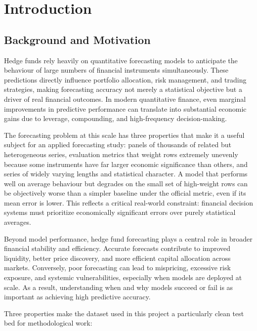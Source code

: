 \section{Introduction}
\label{sec:problem}

\subsection{Background and Motivation}
\label{sec:intro:background}

Hedge funds rely heavily on quantitative forecasting models to anticipate the behaviour of large numbers of financial instruments simultaneously. These predictions directly influence portfolio allocation, risk management, and trading strategies, making forecasting accuracy not merely a statistical objective but a driver of real financial outcomes. In modern quantitative finance, even marginal improvements in predictive performance can translate into substantial economic gains due to leverage, compounding, and high-frequency decision-making.

The forecasting problem at this scale has three properties that make it a useful subject for an applied forecasting study: panels of thousands of related but heterogeneous series, evaluation metrics that weight rows extremely unevenly because some instruments have far larger economic significance than others, and series of widely varying lengths and statistical character. A model that performs well on average behaviour but degrades on the small set of high-weight rows can be objectively worse than a simpler baseline under the official metric, even if its mean error is lower. This reflects a critical real-world constraint: financial decision systems must prioritize economically significant errors over purely statistical averages.

Beyond model performance, hedge fund forecasting plays a central role in broader financial stability and efficiency. Accurate forecasts contribute to improved liquidity, better price discovery, and more efficient capital allocation across markets. Conversely, poor forecasting can lead to mispricing, excessive risk exposure, and systemic vulnerabilities, especially when models are deployed at scale. As a result, understanding when and why models succeed or fail is as important as achieving high predictive accuracy.

Three properties make the dataset used in this project a particularly clean test bed for methodological work:

